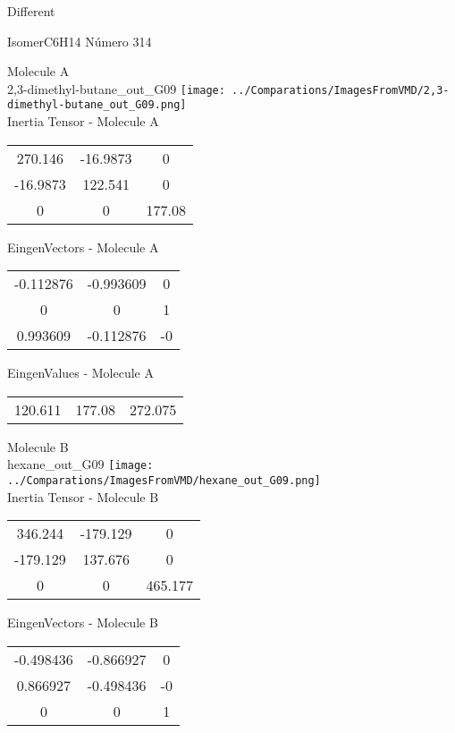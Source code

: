 \begin{center}
\vtab
\vtab
\textcolor{NavyBlue}{\Large Different}
\end{center}

 \newpage

\vtab[-2cm]
\begin{center}
{\large IsomerC6H14 \tab Número 314}
\end{center}
\begin{multicols}{2}
\begin{center}

Molecule A \\ 
2,3-dimethyl-butane\_out\_G09
\texttt{[image: ../Comparations/ImagesFromVMD/2,3-dimethyl-butane\_out\_G09.png]}
\\
Inertia Tensor - Molecule A \\
\vtab

\begin{tabular}{|c c c|}
270.146	 & 	-16.9873	 & 	0	 \\
-16.9873	 & 	122.541	 & 	0	 \\
0	 & 	0	 & 	177.08
\end{tabular}

\vtab
 EingenVectors - Molecule A     \\
\vtab
\begin{tabular}{|c c c|}
-0.112876	 & 	-0.993609	 & 	0	 \\
0	 & 	0	 & 	1	 \\
0.993609	 & 	-0.112876	 & 	-0
\end{tabular}

\vtab
 EingenValues - Molecule A     \\
\vtab
\begin{tabular}{|c c c|}
120.611	 & 	177.08	 & 	272.075	 \\
\end{tabular}
\columnbreak

Molecule B \\ 
hexane\_out\_G09
\texttt{[image: ../Comparations/ImagesFromVMD/hexane\_out\_G09.png]}
\\
Inertia Tensor - Molecule B \\
\vtab

\begin{tabular}{|c c c|}
346.244	 & 	-179.129	 & 	0	 \\
-179.129	 & 	137.676	 & 	0	 \\
0	 & 	0	 & 	465.177
\end{tabular}

\vtab
 EingenVectors - Molecule B     \\
\vtab
\begin{tabular}{|c c c|}
-0.498436	 & 	-0.866927	 & 	0	 \\
0.866927	 & 	-0.498436	 & 	-0	 \\
0	 & 	0	 & 	1
\end{tabular}


\end{center}
\end{multicols}
